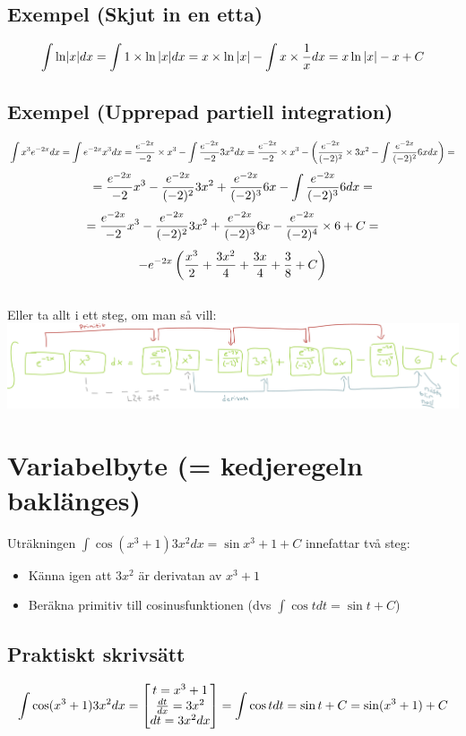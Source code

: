 \documentclass{article}
\begin{document}
\subsection{Exempel (Skjut in en etta)}
$$ \int{\ln \lvert x\rvert dx}=\int{1\times \ln{\lvert x\rvert} dx} = x \times \ln{\lvert x\rvert} - \int{x \times \frac{1}{x} dx} = x \ln{\lvert x\rvert} - x + C $$

\subsection{Exempel (Upprepad partiell integration)}
$$ \int{x^3 e^{-2x} dx} = \int{e^{-2x}x^3 dx} = \frac{e^{-2x}}{-2} \times x^3 - \int{\frac{e^{-2x}}{-2} 3x^2 dx} = \frac{e^{-2x}}{-2}\times x^3 - \left( \frac{e^{-2x}}{(-2)^2}\times 3x^2 - \int{\frac{e^{-2x}}{(-2)^2} 6x dx}\right)=$$
$$ = \frac{e^{-2x}}{-2}x^3  - \frac{e^{-2x}}{(-2)^2} 3x^2 + \frac{e^{-2x}}{(-2)^3}6x - \int{\frac{e^{-2x}}{(-2)^3} 6 dx}=$$
$$ = \frac{e^{-2x}}{-2}x^3  - \frac{e^{-2x}}{(-2)^2} 3x^2 + \frac{e^{-2x}}{(-2)^3}6x - \frac{e^{-2x}}{(-2)^4}\times 6 + C=$$
$$ -e^{-2x}\left(\frac{x^3}{2} + \frac{3x^2}{4} + \frac{3x}{4} + \frac{3}{8} + C\right) $$
\\
Eller ta allt i ett steg, om man så vill:\\
\includegraphics[scale=0.3]{img/img2.pdf}

\section{Variabelbyte (= kedjeregeln baklänges)}
Uträkningen $\int{\cos(x^3+1)3x^2 dx} = \sin{x^3+1} + C$ innefattar två steg:
\begin{itemize}
    \item Känna igen att $3x^2$ är derivatan av $x^3+1$
    \item Beräkna primitiv till cosinusfunktionen (dvs $\int{\cos t dt} = \sin t + C$)
\end{itemize}

\subsection{Praktiskt skrivsätt}
$$ \int{\cos(x^3+1)3x^2 dx} = \left[\begin{matrix}t=x^3+1 \\ \frac{dt}{dx} = 3x^2 \\ dt=3x^2 dx\end{matrix}\right] = \int{\cos t dt} = \sin t + C = \sin (x^3+1) + C$$
\end{document}
